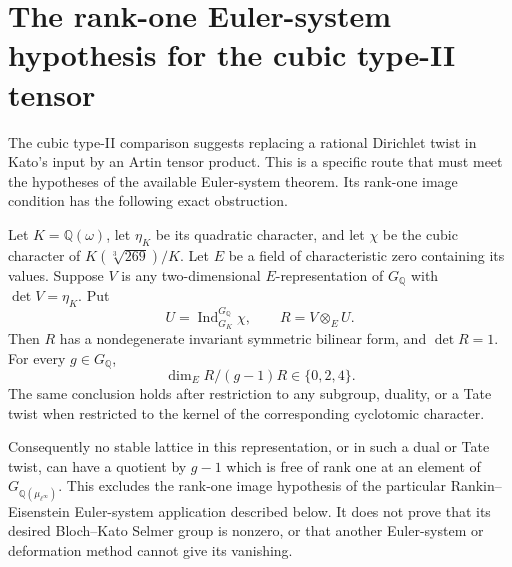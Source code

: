 \section{The rank-one Euler-system hypothesis for the cubic type-II tensor}
\label{sec:cubic-rankin-parity}

The cubic type-II comparison suggests replacing a rational
Dirichlet twist in Kato's input by an Artin tensor product.
This is a specific route that must meet the hypotheses of the
available Euler-system theorem.  Its rank-one image condition
has the following exact obstruction.

\begin{proposition}
\label{AC-K30}
Let $K=\mathbb Q(\omega)$, let $\eta_K$ be its quadratic
character, and let $\chi$ be the cubic character of
$K(\sqrt[3]{269})/K$.  Let $E$ be a field of characteristic
zero containing its values.  Suppose $V$ is any two-dimensional
$E$-representation of $G_{\mathbb Q}$ with
$\det V=\eta_K$.  Put
\[
 U=\operatorname{Ind}_{G_K}^{G_{\mathbb Q}}\chi,
 \qquad R=V\otimes_E U.
                                                        \tag{RS.1}
\]
Then $R$ has a nondegenerate invariant symmetric bilinear form,
and $\det R=1$.  For every $g\in G_{\mathbb Q}$,
\[
               \dim_E R/(g-1)R\in\{0,2,4\}.           \tag{RS.2}
\]
The same conclusion holds after restriction to any subgroup,
duality, or a Tate twist when restricted to the kernel of the
corresponding cyclotomic character.

Consequently no stable lattice in this representation, or in
such a dual or Tate twist, can have a quotient by $g-1$ which
is free of rank one at an element of
$G_{\mathbb Q(\mu_{\ell^\infty})}$.
This excludes the rank-one image hypothesis of the particular
Rankin--Eisenstein Euler-system application described below.
It does not prove that its desired Bloch--Kato Selmer group
is nonzero, or that another Euler-system or deformation
method cannot give its vanishing.
\end{proposition}
